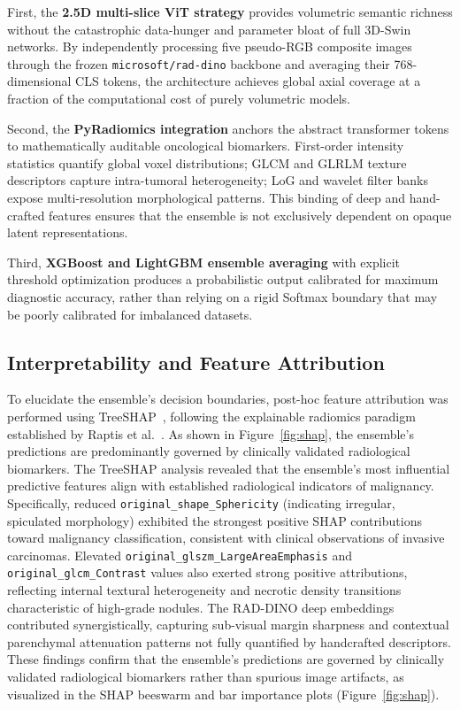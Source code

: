\documentclass{iopjournal}
\begin{document}
First, the \textbf{2.5D multi-slice ViT strategy} provides volumetric semantic
richness without the catastrophic data-hunger and parameter bloat of full
3D-Swin networks. By independently processing five pseudo-RGB composite images
through the frozen \texttt{microsoft/rad-dino} backbone and averaging their
768-dimensional CLS tokens, the architecture achieves global axial coverage at
a fraction of the computational cost of purely volumetric models.

Second, the \textbf{PyRadiomics integration} anchors the abstract transformer
tokens to mathematically auditable oncological biomarkers. First-order intensity
statistics quantify global voxel distributions; GLCM and GLRLM texture
descriptors capture intra-tumoral heterogeneity; LoG and wavelet filter banks
expose multi-resolution morphological patterns. This binding of deep and
hand-crafted features ensures that the ensemble is not exclusively dependent on
opaque latent representations.

Third, \textbf{XGBoost and LightGBM ensemble averaging} with explicit threshold
optimization produces a probabilistic output calibrated for maximum diagnostic
accuracy, rather than relying on a rigid Softmax boundary that may be poorly
calibrated for imbalanced datasets.

\subsection{Interpretability and Feature Attribution}

To elucidate the ensemble's decision boundaries, post-hoc feature attribution
was performed using TreeSHAP~\cite{lundberg2020local}, following the explainable
radiomics paradigm established by Raptis et al.\ \cite{raptis2024pixels}. As
shown in Figure~\ref{fig:shap}, the ensemble's predictions are predominantly
governed by clinically validated radiological biomarkers. The TreeSHAP analysis
revealed that the ensemble's most influential predictive features align with
established radiological indicators of malignancy. Specifically, reduced
\texttt{original\_shape\_Sphericity} (indicating irregular, spiculated
morphology) exhibited the strongest positive SHAP contributions toward
malignancy classification, consistent with clinical observations of invasive
carcinomas. Elevated \texttt{original\_glszm\_LargeAreaEmphasis} and
\texttt{original\_glcm\_Contrast} values also exerted strong positive
attributions, reflecting internal textural heterogeneity and necrotic density
transitions characteristic of high-grade nodules. The RAD-DINO deep embeddings
contributed synergistically, capturing sub-visual margin sharpness and
contextual parenchymal attenuation patterns not fully quantified by handcrafted
descriptors. These findings confirm that the ensemble's predictions are governed
by clinically validated radiological biomarkers rather than spurious image
artifacts, as visualized in the SHAP beeswarm and bar importance plots
(Figure~\ref{fig:shap}).
\end{document}
